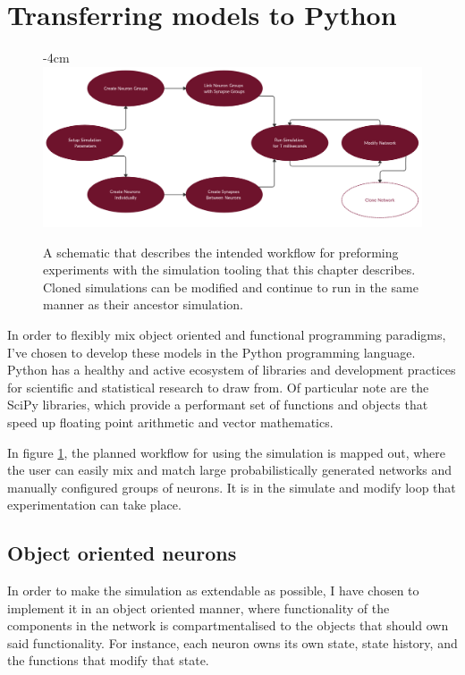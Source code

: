 
\section{Transferring models to Python}

\begin{figure}[h]
    \centering
    \addtolength{\leftskip} {-4cm}
    \addtolength{\rightskip}{-4cm}
    \includegraphics[width=1.3\linewidth]{figures/images/workflow.png}
    \caption[Workflow of project simulation]{A schematic that describes the intended workflow for preforming experiments with the simulation tooling that this chapter describes. Cloned simulations can be modified and continue to run in the same manner as their ancestor simulation.}
    \label{fig:workflow}
\end{figure}

In order to flexibly mix object oriented and functional programming paradigms,
I've chosen to develop these models in the Python programming language. Python has a healthy and active ecosystem of libraries and development practices
for scientific and statistical research to draw from. Of particular note are the
SciPy libraries, which provide a performant set of functions and objects that
speed up floating point arithmetic and vector mathematics. 

In figure \ref{fig:workflow}, the planned workflow for using the simulation is
mapped out, where the user can easily mix and match large probabilistically
generated networks and manually configured groups of neurons. It is in the
simulate and modify loop that experimentation can take place.

\subsection{Object oriented neurons}

In order to make the simulation as extendable as possible, I have chosen to
implement it in an object oriented manner, where functionality of the components
in the network is compartmentalised to the objects that should own said
functionality. For instance, each neuron owns its own state, state history, and
the functions that modify that state.


